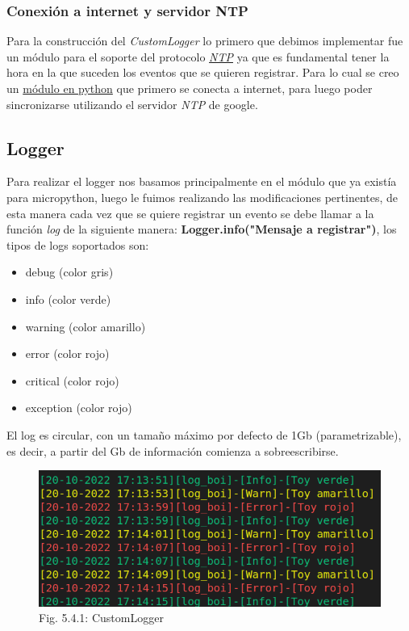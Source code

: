 \documentclass[12pt]{article}
\begin{document}
\subsubsection{Conexión a internet y servidor NTP}
Para la construcción del \textit{CustomLogger} lo primero que debimos implementar fue un módulo para el soporte del protocolo \href{https://es.wikipedia.org/wiki/Network_Time_Protocol}{\textit{NTP}} \cite{ntp} ya que es fundamental tener la hora en la que suceden los eventos que se quieren registrar. Para lo cual se creo un \href{https://github.com/sofia-am/DJI_Payload_Development/blob/main/log/micropython/lib/us_ntp.py}{módulo en python} \cite{repo} que primero se conecta a internet, para luego poder sincronizarse utilizando el servidor \textit{NTP} de google.

\subsection{Logger}
Para realizar el logger nos basamos principalmente en el módulo que ya existía para micropython, luego le fuimos realizando las modificaciones pertinentes, de esta manera cada vez que se quiere registrar un evento se debe llamar a la función \textit{log} de la siguiente manera: \textbf{Logger.info("Mensaje a registrar")}, los tipos de logs soportados son:
\begin{itemize}
  \item debug (color gris)
  \item info (color verde)
  \item warning (color amarillo)
  \item error (color rojo)
  \item critical (color rojo)
  \item exception (color rojo)
\end{itemize}
El log es circular, con un tamaño máximo por defecto de 1Gb (parametrizable), es decir, a partir del Gb de información comienza a sobreescribirse.

\begin{figure}
  \begin{center}
      \includegraphics[scale=0.5]{images/PyCom-Logger.png}
      \caption{Fig. 5.4.1: CustomLogger}
  \end{center}  
\end{figure}
\end{document}
